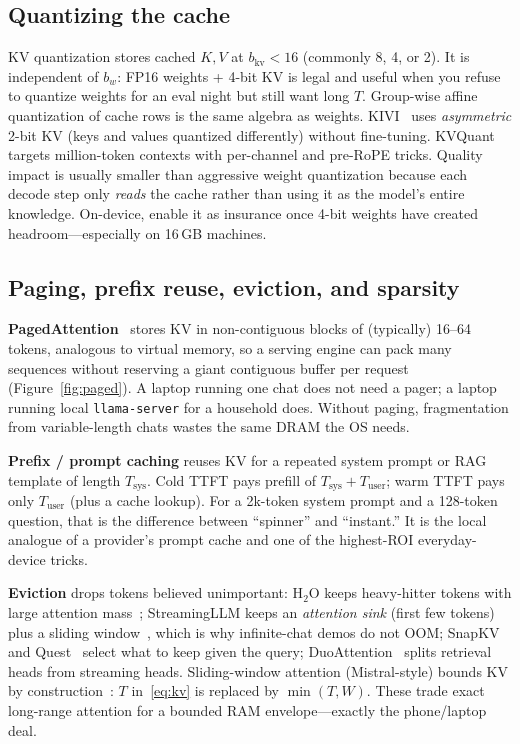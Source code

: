 \subsection{Quantizing the cache}

KV quantization stores cached \(K,V\) at \(b_{\mathrm{kv}} < 16\) (commonly 8, 4, or 2). It is independent of \(b_w\): FP16 weights + 4-bit KV is legal and useful when you refuse to quantize weights for an eval night but still want long \(T\). Group-wise affine quantization of cache rows is the same algebra as weights. KIVI~\citep{liu2024kivi} uses \emph{asymmetric} 2-bit KV (keys and values quantized differently) without fine-tuning. KVQuant~\citep{hooper2024kvquant} targets million-token contexts with per-channel and pre-RoPE tricks. Quality impact is usually smaller than aggressive weight quantization because each decode step only \emph{reads} the cache rather than using it as the model's entire knowledge. On-device, enable it as insurance once 4-bit weights have created headroom---especially on 16\,GB machines.

\subsection{Paging, prefix reuse, eviction, and sparsity}

\textbf{PagedAttention}~\citep{kwon2023vllm} stores KV in non-contiguous blocks of (typically) 16--64 tokens, analogous to virtual memory, so a serving engine can pack many sequences without reserving a giant contiguous buffer per request (Figure~\ref{fig:paged}). A laptop running one chat does not need a pager; a laptop running local \texttt{llama-server} for a household does. Without paging, fragmentation from variable-length chats wastes the same DRAM the OS needs.

\textbf{Prefix / prompt caching} reuses KV for a repeated system prompt or RAG template of length \(T_{\mathrm{sys}}\). Cold TTFT pays prefill of \(T_{\mathrm{sys}}+T_{\mathrm{user}}\); warm TTFT pays only \(T_{\mathrm{user}}\) (plus a cache lookup). For a 2k-token system prompt and a 128-token question, that is the difference between ``spinner'' and ``instant.'' It is the local analogue of a provider's prompt cache and one of the highest-ROI everyday-device tricks.

\textbf{Eviction} drops tokens believed unimportant: H\(_2\)O keeps heavy-hitter tokens with large attention mass~\citep{zhang2023h2o}; StreamingLLM keeps an \emph{attention sink} (first few tokens) plus a sliding window~\citep{xiao2024streamingllm}, which is why infinite-chat demos do not OOM; SnapKV~\citep{li2024snapkv} and Quest~\citep{tang2024quest} select what to keep given the query; DuoAttention~\citep{xiao2024duoattention} splits retrieval heads from streaming heads. Sliding-window attention (Mistral-style) bounds KV by construction~\citep{mistral2023}: \(T\) in~\eqref{eq:kv} is replaced by \(\min(T,W)\). These trade exact long-range attention for a bounded RAM envelope---exactly the phone/laptop deal.

